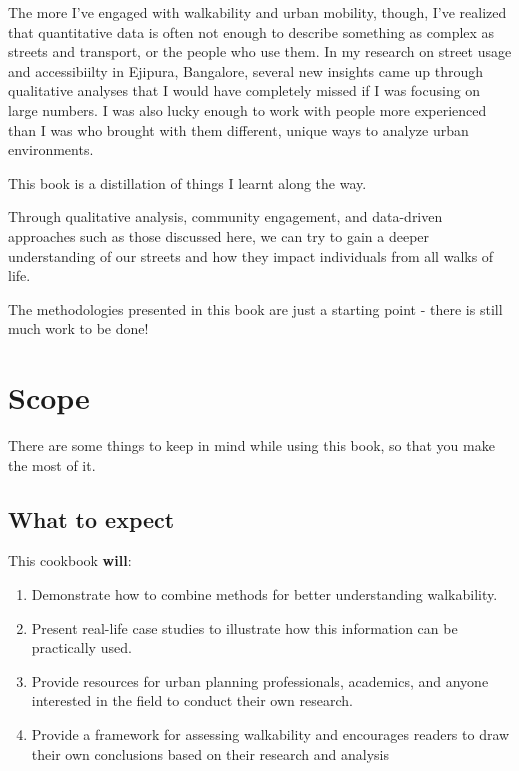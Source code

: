 \documentclass[
]{latex/krantz}
\providecommand{\tightlist}{%
  \setlength{\itemsep}{0pt}\setlength{\parskip}{0pt}}
\begin{document}
The more I've engaged with walkability and urban mobility, though, I've realized that quantitative data is often not enough to describe something as complex as streets and transport, or the people who use them. In my research on street usage and accessibiilty in Ejipura, Bangalore, several new insights came up through qualitative analyses that I would have completely missed if I was focusing on large numbers. I was also lucky enough to work with people more experienced than I was who brought with them different, unique ways to analyze urban environments.

This book is a distillation of things I learnt along the way.

Through qualitative analysis, community engagement, and data-driven approaches such as those discussed here, we can try to gain a deeper understanding of our streets and how they impact individuals from all walks of life.

The methodologies presented in this book are just a starting point - there is still much work to be done!

\hypertarget{scope}{%
\section{Scope}\label{scope}}

There are some things to keep in mind while using this book, so that you make the most of it.

\hypertarget{what-to-expect}{%
\subsection{What to expect}\label{what-to-expect}}

This cookbook \textbf{will}:

\begin{enumerate}
\def\labelenumi{\arabic{enumi}.}
\tightlist
\item
  Demonstrate how to combine methods for better understanding walkability.
\item
  Present real-life case studies to illustrate how this information can be practically used.
\item
  Provide resources for urban planning professionals, academics, and anyone interested in the field to conduct their own research.
\item
  Provide a framework for assessing walkability and encourages readers to draw their own conclusions based on their research and analysis
\end{enumerate}
\end{document}
